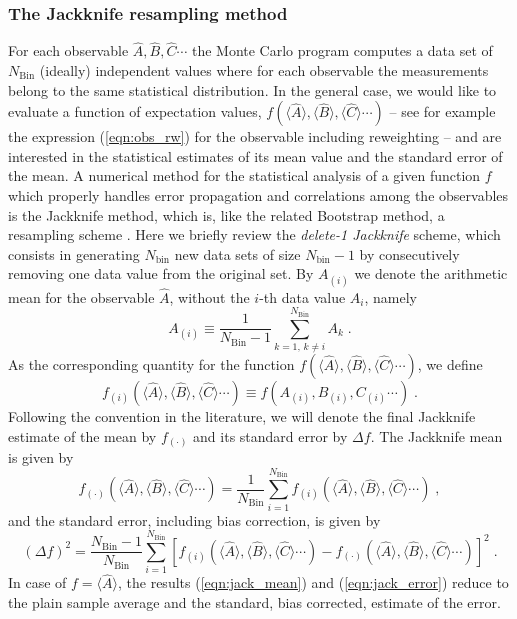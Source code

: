 \subsubsection{The Jackknife resampling method}\label{sec:jack}
%
For each observable $\hat{A}, \hat{B},\hat{C} \cdots$ the Monte Carlo program computes a data set of $N_{\text{Bin}}$ (ideally) independent values where for each observable the measurements belong to the same  statistical distribution.  In the general case, we would like to evaluate a function of expectation values, $f(\langle \hat{A} \rangle, \langle \hat{B} \rangle, \langle \hat{C} \rangle  \cdots)$ --
see for example the expression (\ref{eqn:obs_rw}) for the observable including reweighting --
and are interested in the statistical estimates of its mean value  and the standard error of the mean.
A numerical method for the statistical analysis of a given function $f$ which properly handles error propagation and correlations among the observables is the Jackknife method, which is, like the related Bootstrap method, a resampling scheme \cite{efron1981}.
Here we briefly review the \textit{delete-1 Jackknife} scheme, which consists in generating $N_{\text{bin}}$ new data sets of size $N_{\text{bin}}-1$ by consecutively removing one data value from the original set. By $A_{(i)}$ we denote the arithmetic mean for the observable $\hat{A}$, without the $i$-th data value $A_{i}$, namely
\begin{equation}
A_{(i)} \equiv \frac{1}{N_{\text{Bin}}-1} \sum\limits_{k=1,\,k\neq i}^{N_{\text{Bin}}} A_{k}\;.
\end{equation}
As the corresponding quantity for  the function $f(\langle \hat{A} \rangle, \langle \hat{B} \rangle, \langle \hat{C} \rangle  \cdots)$, we define 
\begin{equation}
f_{(i)}(\langle \hat{A} \rangle, \langle \hat{B} \rangle, \langle \hat{C} \rangle  \cdots) \equiv
f( A_{(i)}, B_{(i)},C_{(i)}\cdots)\;.
\end{equation}
Following the convention in the literature, we will denote the final Jackknife estimate of the mean by $f_{(\cdot)}$ and its standard error by $\Delta f$. The Jackknife mean is  given by
\begin{equation}
\label{eqn:jack_mean}
f_{(\cdot)}(\langle \hat{A} \rangle, \langle \hat{B} \rangle, \langle \hat{C} \rangle  \cdots) =
\frac{1}{N_{\text{Bin}}}\sum\limits_{i=1}^{N_{\text{Bin}}} f_{(i)}(\langle \hat{A} \rangle, \langle \hat{B} \rangle, \langle \hat{C} \rangle  \cdots)\;,
\end{equation}
and the standard error, including bias correction, is given by
\begin{equation}
\label{eqn:jack_error}
(\Delta f)^{2} = 
\frac{N_{\text{Bin}}-1}{N_{\text{Bin}}} \sum\limits_{i=1}^{N_{\text{Bin}}}
\left[f_{(i)}(\langle \hat{A} \rangle, \langle \hat{B} \rangle, \langle \hat{C} \rangle  \cdots)
- f_{(\cdot)}(\langle \hat{A} \rangle, \langle \hat{B} \rangle, \langle \hat{C} \rangle  \cdots)\right]^{2}\;.
\end{equation}
In case of $f=\langle\hat A\rangle$, the results (\ref{eqn:jack_mean}) and (\ref{eqn:jack_error}) reduce to the plain sample average and the standard, bias corrected, estimate of the error.

